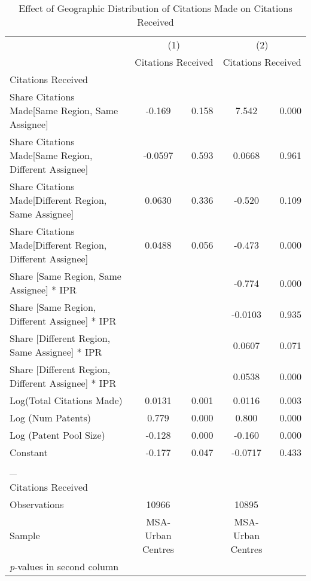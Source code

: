 {
\begin{longtable}{l*{2}{cc}}
\caption{Effect of Geographic Distribution of Citations Made on Citations Received \label{model13}}\\
\hline\hline\endfirsthead\hline\endhead\hline\endfoot\endlastfoot
                &\multicolumn{2}{c}{(1)}&\multicolumn{2}{c}{(2)}\\
                &\multicolumn{2}{c}{Citations Received}&\multicolumn{2}{c}{Citations Received}\\
\hline
Citations Received&         &         &         &         \\
Share Citations Made[Same Region, Same Assignee]&   -0.169&    0.158&    7.542&    0.000\\
Share Citations Made[Same Region, Different Assignee]&  -0.0597&    0.593&   0.0668&    0.961\\
Share Citations Made[Different Region, Same Assignee]&   0.0630&    0.336&   -0.520&    0.109\\
Share Citations Made[Different Region, Different Assignee]&   0.0488&    0.056&   -0.473&    0.000\\
Share [Same Region, Same Assignee] * IPR&         &         &   -0.774&    0.000\\
Share [Same Region, Different Assignee] * IPR&         &         &  -0.0103&    0.935\\
Share [Different Region, Same Assignee] * IPR&         &         &   0.0607&    0.071\\
Share [Different Region, Different Assignee] * IPR&         &         &   0.0538&    0.000\\
Log(Total Citations Made)&   0.0131&    0.001&   0.0116&    0.003\\
Log (Num Patents)&    0.779&    0.000&    0.800&    0.000\\
Log (Patent Pool Size)&   -0.128&    0.000&   -0.160&    0.000\\
Constant        &   -0.177&    0.047&  -0.0717&    0.433\\
\hline
\_               &         &         &         &         \\
Citations Received&         &         &         &         \\
\hline
Observations    &    10966&         &    10895&         \\
Sample          &MSA-Urban Centres&         &MSA-Urban Centres&         \\
\hline\hline
\multicolumn{5}{l}{\footnotesize \textit{p}-values in second column}\\
\end{longtable}
}

